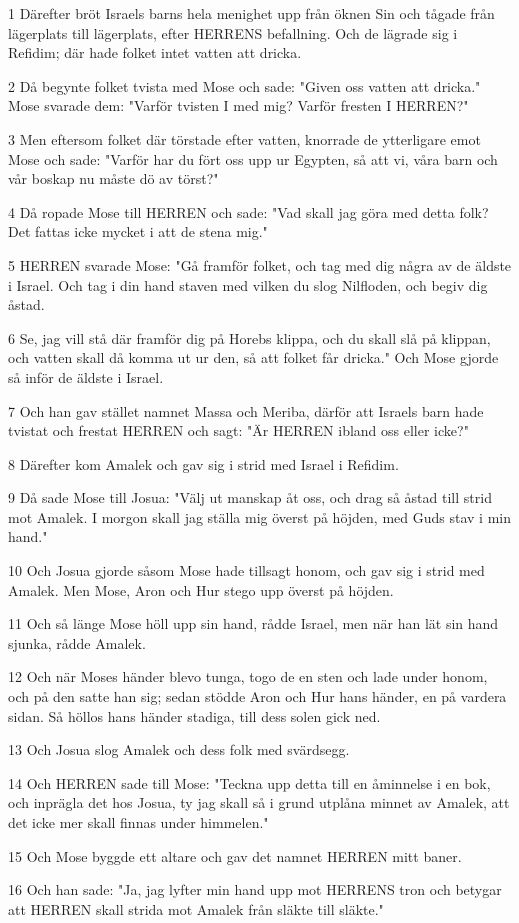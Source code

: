 \par 1 Därefter bröt Israels barns hela menighet upp från öknen Sin och tågade från lägerplats till lägerplats, efter HERRENS befallning. Och de lägrade sig i Refidim; där hade folket intet vatten att dricka.
\par 2 Då begynte folket tvista med Mose och sade: "Given oss vatten att dricka." Mose svarade dem: "Varför tvisten I med mig? Varför fresten I HERREN?"
\par 3 Men eftersom folket där törstade efter vatten, knorrade de ytterligare emot Mose och sade: "Varför har du fört oss upp ur Egypten, så att vi, våra barn och vår boskap nu måste dö av törst?"
\par 4 Då ropade Mose till HERREN och sade: "Vad skall jag göra med detta folk? Det fattas icke mycket i att de stena mig."
\par 5 HERREN svarade Mose: "Gå framför folket, och tag med dig några av de äldste i Israel. Och tag i din hand staven med vilken du slog Nilfloden, och begiv dig åstad.
\par 6 Se, jag vill stå där framför dig på Horebs klippa, och du skall slå på klippan, och vatten skall då komma ut ur den, så att folket får dricka." Och Mose gjorde så inför de äldste i Israel.
\par 7 Och han gav stället namnet Massa och Meriba, därför att Israels barn hade tvistat och frestat HERREN och sagt: "Är HERREN ibland oss eller icke?"
\par 8 Därefter kom Amalek och gav sig i strid med Israel i Refidim.
\par 9 Då sade Mose till Josua: "Välj ut manskap åt oss, och drag så åstad till strid mot Amalek. I morgon skall jag ställa mig överst på höjden, med Guds stav i min hand."
\par 10 Och Josua gjorde såsom Mose hade tillsagt honom, och gav sig i strid med Amalek. Men Mose, Aron och Hur stego upp överst på höjden.
\par 11 Och så länge Mose höll upp sin hand, rådde Israel, men när han lät sin hand sjunka, rådde Amalek.
\par 12 Och när Moses händer blevo tunga, togo de en sten och lade under honom, och på den satte han sig; sedan stödde Aron och Hur hans händer, en på vardera sidan. Så höllos hans händer stadiga, till dess solen gick ned.
\par 13 Och Josua slog Amalek och dess folk med svärdsegg.
\par 14 Och HERREN sade till Mose: "Teckna upp detta till en åminnelse i en bok, och inprägla det hos Josua, ty jag skall så i grund utplåna minnet av Amalek, att det icke mer skall finnas under himmelen."
\par 15 Och Mose byggde ett altare och gav det namnet HERREN mitt baner.
\par 16 Och han sade: "Ja, jag lyfter min hand upp mot HERRENS tron och betygar att HERREN skall strida mot Amalek från släkte till släkte."

